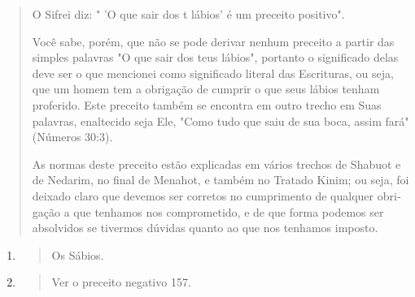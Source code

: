 \begin{quote}
O Sifrei diz: " 'O que sair dos t lábios' é um preceito positivo".

Você sabe, porém, que não se pode derivar nenhum preceito a partir das
sim­ples palavras "O que sair dos teus lábios", portanto o significado
delas deve ser o que mencionei como significado literal das Escrituras,
ou seja, que um homem tem a obrigação de cumprir o que seus lábios
tenham proferido. Este preceito também se encontra em outro trecho em
Suas palavras, enaltecido se­ja Ele, "Como tudo que saiu de sua boca,
assim fará" (Números 30:3).

As normas deste preceito estão explicadas em vários trechos de Sha­buot
e de Nedarim, no final de Menahot, e também no Tratado Kinim; ou seja,
foi deixado claro que devemos ser corretos no cumprimento de qualquer
obri­gação a que tenhamos nos comprometido, e de que forma podemos ser
absol­vidos se tivermos dúvidas quanto ao que nos tenhamos imposto.
\end{quote}

\begin{enumerate}
\def\labelenumi{\arabic{enumi}.}
\setcounter{enumi}{126}
\item
  \begin{quote}
  Os Sábios.
  \end{quote}
\item
  \begin{quote}
  Ver o preceito negativo 157.
  \end{quote}
\end{enumerate}

